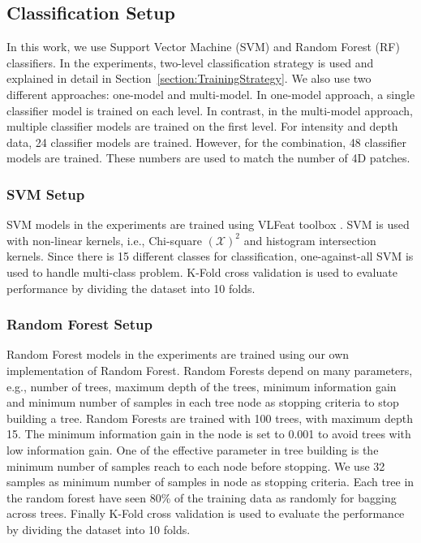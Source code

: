         
        \subsection{Classification Setup}
        \label{section:ClassificationStrategy}
        In this work, we use Support Vector Machine (SVM) and Random Forest (RF) classifiers. In the experiments, two-level classification strategy is used and explained in detail in Section~\ref{section:TrainingStrategy}. We also use two different approaches: one-model and multi-model. In one-model approach, a single classifier model is trained on each level. In contrast, in the multi-model approach, multiple classifier models are trained on the first level. For intensity and depth data, 24 classifier models are trained. However, for the combination, 48 classifier models are trained. These numbers are used to match the number of 4D patches.
        
        
        \subsubsection{SVM Setup}
        \label{section:SVMSetup}
         SVM models in the experiments are trained using VLFeat toolbox \cite{Vedaldi:2010:VOP:1873951.1874249}. SVM is used with non-linear kernels, i.e., Chi-square $ \left(\mathcal{X}\right)^{2} $ and histogram intersection kernels. Since there is 15 different classes for classification, one-against-all SVM is used to handle multi-class problem. K-Fold cross validation is used to evaluate performance by dividing the dataset into 10 folds.
        
        \subsubsection{Random Forest Setup}
        \label{section:RandomForestSetup}
        Random Forest models in the experiments are trained using our own implementation of Random Forest. Random Forests depend on many parameters, e.g., number of trees, maximum depth of the trees, minimum information gain and minimum number of samples in each tree node as stopping criteria to stop building a tree. Random Forests are trained with 100 trees, with maximum depth 15. The minimum information gain in the node is set to 0.001 to avoid trees with low information gain. One of the effective parameter in tree building is the minimum number of samples reach to each node before stopping. We use 32 samples as minimum number of samples in node as stopping criteria. Each tree in the random forest have seen 80\% of the training data as randomly for bagging across trees. Finally K-Fold cross validation is used to evaluate the performance by dividing the dataset into 10 folds.


